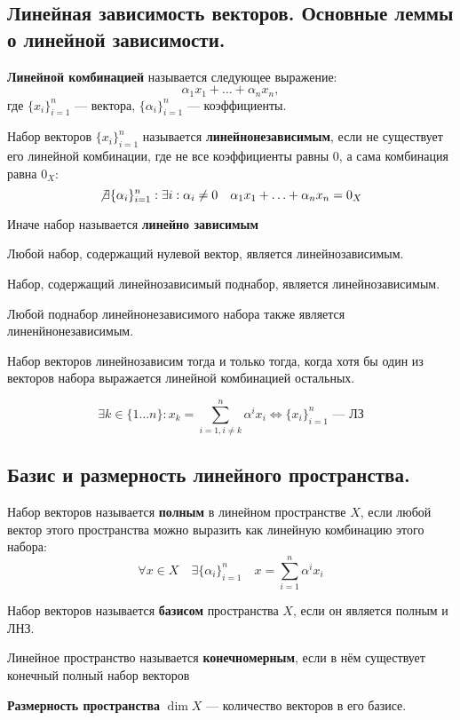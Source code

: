 \subsection{Линейная зависимость векторов. Основные леммы о линейной зависимости.}
\begin{definition}
    \textbf{Линейной комбинацией} называется следующее выражение: $$\alpha_1x_1+\ldots+\alpha_nx_n,$$ где $\{x_i\}_{i=1}^n$ --- вектора, $\{\alpha_i\}_{i=1}^n$ --- коэффициенты.
\end{definition}
\begin{definition}
    Набор векторов $\{x_i\}_{i=1}^n$ называется \textbf{линейнонезависимым}, если не существует его линейной комбинации, где не все коэффициенты равны $0$, а сама комбинация равна $0_X$:
    $$\not\exists \{\alpha_i\}_{i=1}^n : \exists i : \alpha_i\not=0 \quad \alpha_1x_1+\ldots+\alpha_nx_n=0_X$$

    Иначе набор называется \textbf{линейно зависимым}
\end{definition}
\begin{lemma}
    Любой набор, содержащий нулевой вектор, является линейнозависимым.
\end{lemma}
\begin{lemma}
    Набор, содержащий линейнозависимый поднабор, является линейнозависимым.
\end{lemma}
\begin{lemma}
    Любой поднабор линейнонезависимого набора также является линенйнонезависимым.
\end{lemma}
\begin{lemma}
    Набор векторов линейнозависим тогда и только тогда, когда хотя бы один из векторов набора выражается линейной комбинацией остальных.

    $$\exists k\in\{1\ldots n\}: x_k=\sum\limits_{i=1, i\not=k}^n\alpha^ix_i \Leftrightarrow \{x_i\}_{i=1}^n \text{ --- ЛЗ}$$
\end{lemma}
\subsection{Базис и размерность линейного пространства.}
\begin{definition}
    Набор векторов называется \textbf{полным} в линейном пространстве $X$, если любой вектор этого пространства можно выразить как линейную комбинацию этого набора:
    $$\forall x\in X \quad \exists \{\alpha_i\}_{i=1}^n \quad x=\sum\limits_{i=1}^n\alpha^ix_i$$
\end{definition}
\begin{definition}
    Набор векторов называется \textbf{базисом} пространства $X$, если он является полным и ЛНЗ.
\end{definition}
\begin{definition}
    Линейное пространство называется \textbf{конечномерным}, если в нём существует конечный полный набор векторов
\end{definition}
\begin{definition}
    \textbf{Размерность пространства} $\dim X$ --- количество векторов в его базисе.
\end{definition}
